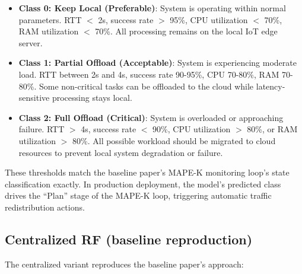 \begin{itemize}
  \item \textbf{Class 0: Keep Local (Preferable)}: System is operating within normal parameters. RTT $<$ 2s, success rate $>$ 95\%, CPU utilization $<$ 70\%, RAM utilization $<$ 70\%. All processing remains on the local IoT edge server.
  
  \item \textbf{Class 1: Partial Offload (Acceptable)}: System is experiencing moderate load. RTT between 2s and 4s, success rate 90-95\%, CPU 70-80\%, RAM 70-80\%. Some non-critical tasks can be offloaded to the cloud while latency-sensitive processing stays local.
  
  \item \textbf{Class 2: Full Offload (Critical)}: System is overloaded or approaching failure. RTT $>$ 4s, success rate $<$ 90\%, CPU utilization $>$ 80\%, or RAM utilization $>$ 80\%. All possible workload should be migrated to cloud resources to prevent local system degradation or failure.
\end{itemize}

These thresholds match the baseline paper's MAPE-K monitoring loop's state classification exactly. In production deployment, the model's predicted class drives the ``Plan'' stage of the MAPE-K loop, triggering automatic traffic redistribution actions.

\subsection{Centralized RF (baseline reproduction)}
\label{subsec:centralized}

The centralized variant reproduces the baseline paper's approach:

